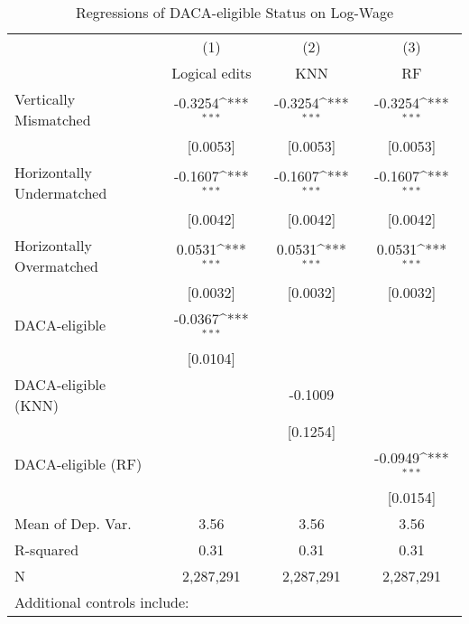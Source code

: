 \begin{table}[htbp]\centering
\def\sym#1{\ifmmode^{#1}\else\(^{#1}\)\fi}
\caption{Regressions of DACA-eligible Status on Log-Wage}
\begin{tabular}{l*{3}{c}}
\toprule
                    &\multicolumn{1}{c}{(1)}         &\multicolumn{1}{c}{(2)}         &\multicolumn{1}{c}{(3)}         \\
                    &Logical edits         &         KNN         &          RF         \\
\midrule
Vertically Mismatched&     -0.3254\sym{***}&     -0.3254\sym{***}&     -0.3254\sym{***}\\
                    &    [0.0053]         &    [0.0053]         &    [0.0053]         \\
\addlinespace
Horizontally Undermatched&     -0.1607\sym{***}&     -0.1607\sym{***}&     -0.1607\sym{***}\\
                    &    [0.0042]         &    [0.0042]         &    [0.0042]         \\
\addlinespace
Horizontally Overmatched&      0.0531\sym{***}&      0.0531\sym{***}&      0.0531\sym{***}\\
                    &    [0.0032]         &    [0.0032]         &    [0.0032]         \\
\addlinespace
DACA-eligible       &     -0.0367\sym{***}&                     &                     \\
                    &    [0.0104]         &                     &                     \\
\addlinespace
DACA-eligible (KNN) &                     &     -0.1009         &                     \\
                    &                     &    [0.1254]         &                     \\
\addlinespace
DACA-eligible (RF)  &                     &                     &     -0.0949\sym{***}\\
                    &                     &                     &    [0.0154]         \\
\midrule
Mean of Dep. Var.   &        3.56         &        3.56         &        3.56         \\
R-squared           &        0.31         &        0.31         &        0.31         \\
N                   &   2,287,291         &   2,287,291         &   2,287,291         \\
\bottomrule
\multicolumn{4}{l}{\footnotesize Additional controls include:}\\

\end{tabular}
\end{table}

